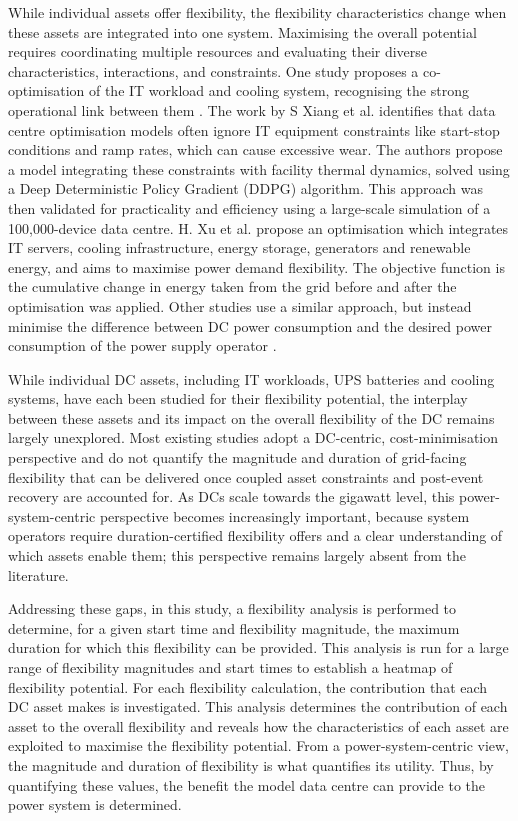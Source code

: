 \documentclass[lettersize,journal]{IEEEtran}
\newcommand{\rev}[1]{\textcolor{blue!70!black}{#1}}
\begin{document}
While individual assets offer flexibility, the flexibility characteristics change when these assets are integrated into one system. Maximising the overall potential requires coordinating multiple resources and evaluating their diverse characteristics, interactions, and constraints. One study proposes a co-optimisation of the IT workload and cooling system, recognising the strong operational link between them \cite{fu2020assessments}. The work by S Xiang et al. \cite{xiang2023modeling} identifies that data centre optimisation models often ignore IT equipment constraints like start-stop conditions and ramp rates, which can cause excessive wear. The authors propose a model integrating these constraints with facility thermal dynamics, solved using a Deep Deterministic Policy Gradient (DDPG) algorithm. This approach was then validated for practicality and efficiency using a large-scale simulation of a 100,000-device data centre.
H. Xu et al. \cite{xu2023data} propose an optimisation which integrates IT servers, cooling infrastructure, energy storage, generators and renewable energy, and aims to maximise power demand flexibility. The objective function is the cumulative change in energy taken from the grid before and after the optimisation was applied. 
Other studies use a similar approach, but instead minimise the difference between DC power consumption and the desired power consumption of the power supply operator \cite{cioara2018optimized}. 

\rev{While individual DC assets, including IT workloads, UPS batteries and cooling systems, have each been studied for their flexibility potential, the interplay between these assets and its impact on the overall flexibility of the DC remains largely unexplored. Most existing studies adopt a DC-centric, cost-minimisation perspective and do not quantify the magnitude and duration of grid-facing flexibility that can be delivered once coupled asset constraints and post-event recovery are accounted for. As DCs scale towards the gigawatt level, this power-system-centric perspective becomes increasingly important, because system operators require duration-certified flexibility offers and a clear understanding of which assets enable them; this perspective remains largely absent from the literature.}

Addressing these gaps, in this study, a flexibility analysis is performed to determine, for a given start time and flexibility magnitude, the maximum duration for which this flexibility can be provided. This analysis is run for a large range of flexibility magnitudes and start times to establish a heatmap of flexibility potential. For each flexibility calculation, the contribution that each DC asset makes is investigated. This analysis determines the contribution of each asset to the overall flexibility and reveals how the characteristics of each asset are exploited to maximise the flexibility potential. From a power-system-centric view, the magnitude and duration of flexibility is what quantifies its utility. Thus, by quantifying these values, the benefit the model data centre can provide to the power system is determined. 
\end{document}

